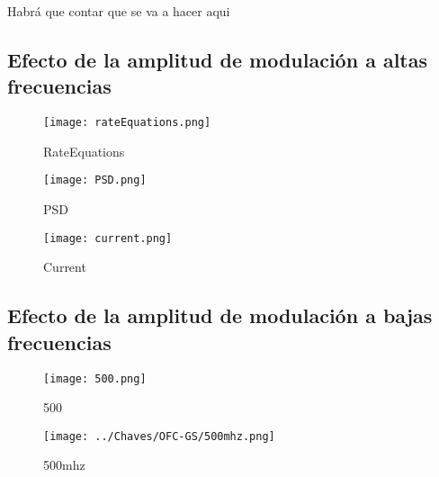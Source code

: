 Habr\'a que contar que se va a hacer aqui

	\subsection{Efecto de la amplitud de modulación a altas frecuencias}

			\begin{figure}[H]
				\centering
				\texttt{[image: rateEquations.png]}
				\caption{\label{Img:rateEquations}RateEquations}	
			\end{figure}

			\begin{figure}[H]
				\centering
				\texttt{[image: PSD.png]}
				\caption{\label{Img:PSD}PSD}	
			\end{figure}

			\begin{figure}[H]
				\centering
				\texttt{[image: current.png]}
				\caption{\label{Img:current}Current}	
			\end{figure}

	\subsection{Efecto de la amplitud de modulación a bajas frecuencias}

			\begin{figure}[H]
				\centering
				\texttt{[image: 500.png]}
				\caption{\label{Img:500}500}	
			\end{figure}

			\begin{figure}[H]
				\centering
				\texttt{[image: ../Chaves/OFC-GS/500mhz.png]}
				\caption{\label{Img:500mhz}500mhz}	
			\end{figure}
